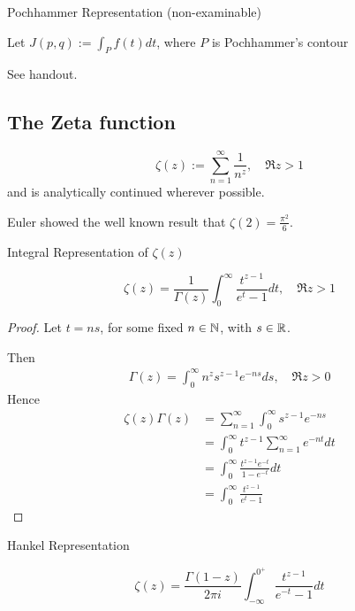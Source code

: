 \documentclass[a4paper]{article}
\begin{document}
\begin{prop} Pochhammer Representation (non-examinable)

	Let $J(p,q) := \int_{P} f(t) dt$, where  $P$ is Pochhammer's contour

\begin{figure}[H]
    \centering
\end{figure}

See handout.
\end{prop}

\subsection{The Zeta function}

\begin{defn}
	\[
		\zeta(z) := \sum_{n=1}^{\infty}\frac{1}{n^{z}}, \quad \Re z > 1
	\]
	and is analytically continued wherever possible.
\end{defn}

Euler showed the well known result that $\zeta(2) = \frac{\pi^2}{6}$.

\begin{prop} Integral Representation of $\zeta(z)$

	\[
		\zeta(z) = \frac{1}{\Gamma(z)} \int_{0}^{\infty} \frac{t^{z-1}}{e^{t} - 1} dt, \quad \Re z > 1
	\] 
\end{prop}

\begin{proof}
	Let $t = ns$, for some fixed $n \in \mathbb{N}$, with $s \in \mathbb{R}$.

	Then
	\begin{align*}
		\Gamma(z) = \int_{0}^{\infty} n^{z} s^{z-1} e^{-ns} ds, \quad \Re z > 0 
	\end{align*}
	Hence 
	\begin{align*}
		\zeta(z) \Gamma(z) &= \sum_{n=1}^{\infty} \int_0^{\infty} s^{z-1} e^{-ns} \\
		&= \int_0^{\infty} t^{z-1} \sum_{n=1}^{\infty} e^{-nt} dt \\
		&= \int_0^{\infty} \frac{t^{z-1} e^{-t}}{1 - e^{-t}} dt \\
		&= \int_0^{\infty} \frac{t^{z-1}}{e^t - 1}
	\end{align*}
\end{proof}

\begin{prop} Hankel Representation 

	\[
		\zeta(z) = \frac{\Gamma(1-z)}{2\pi i} \int_{-\infty}^{0^{+}} \frac{t^{z-1}}{e^{-t} - 1} dt
	\] 
\end{prop}
\end{document}
